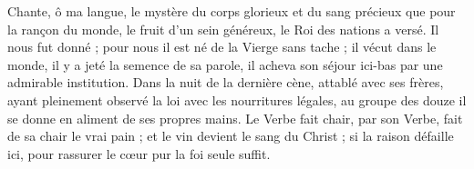 Chante, ô ma langue, le mystère 
du corps glorieux 
et du sang précieux 
que pour la rançon du monde, 
le fruit d’un sein généreux, 
le Roi des nations a versé.
\versseparator
Il nous fut donné ; pour nous il est né 
de la Vierge sans tache ; 
il vécut dans le monde, 
il y a jeté la semence de sa parole, 
il acheva son séjour ici-bas 
par une admirable institution.
\versseparator
Dans la nuit de la dernière cène, 
attablé avec ses frères, 
ayant pleinement observé la loi 
avec les nourritures légales, 
au groupe des douze il se donne 
en aliment de ses propres mains.
\versseparator
Le Verbe fait chair, par son Verbe, 
fait de sa chair le vrai pain ; 
et le vin devient le sang du Christ ; 
si la raison défaille ici, 
pour rassurer le cœur pur
la foi seule suffit.